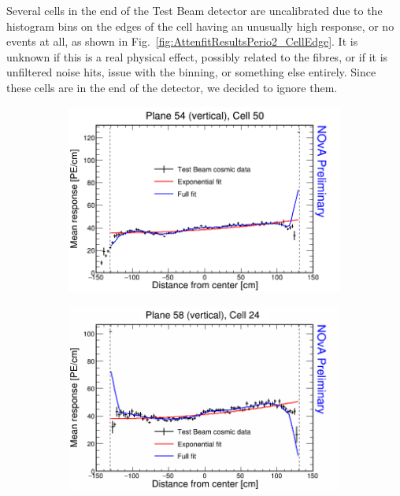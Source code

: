 Several cells in the end of the Test Beam detector are uncalibrated due to the histogram bins on the edges of the cell having an unusually high response, or no events at all, as shown in Fig.~\ref{fig:AttenfitResultsPerio2_CellEdge}. It is unknown if this is a real physical effect, possibly related to the fibres, or if it is unfiltered noise hits, issue with the binning, or something else entirely. Since these cells are in the end of the detector, we decided to ignore them.

\begin{figure}[h]
  \begin{subfigure}{0.495\textwidth}
    \includegraphics[width=\linewidth]{Plots/RelativeCalibrationResults/p2_054_050.png}
  \end{subfigure}
  \begin{subfigure}{0.495\textwidth}
    \includegraphics[width=\linewidth]{Plots/RelativeCalibrationResults/p2_058_024.png}

\end{subfigure}
\end{figure}
